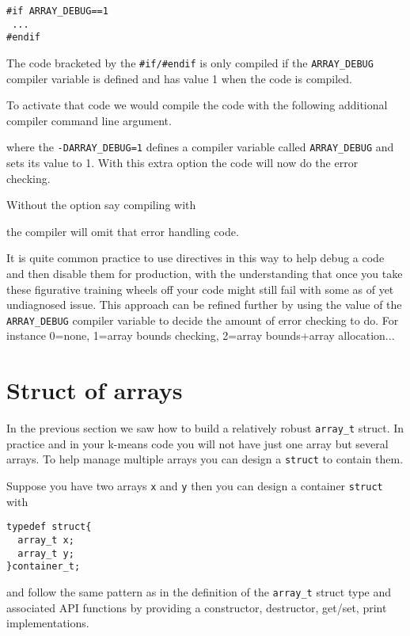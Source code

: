 \begin{verbatim}
#if ARRAY_DEBUG==1
 ...
#endif
\end{verbatim}
The code bracketed by the \texttt{\#if/\#endif} is only compiled if the \texttt{ARRAY\_DEBUG} compiler variable is defined and has value 1 when the code is compiled.

To activate that code we would compile the code with the following additional compiler command line argument.


where the \texttt{-DARRAY\_DEBUG=1} defines a compiler variable called \texttt{ARRAY\_DEBUG} and sets its value to 1. With this extra option the code will now do the error checking.

Without the option say compiling with 


the compiler will omit that error handling code. 

It is quite common practice to use directives in this way to help debug a code and then disable them for production, with the understanding that once you take these figurative training wheels off your code might still fail with some as of yet undiagnosed issue.  This approach can be refined further by using the value of the \texttt{ARRAY\_DEBUG} compiler variable to decide the amount of error checking to do. For instance 0=none, 1=array bounds checking, 2=array bounds+array allocation...

\section{Struct of arrays}

In the previous section we saw how to build a relatively robust \texttt{array\_t} struct. In practice and in your k-means code you will not have just one array but several arrays. To help manage multiple arrays you can design a \texttt{struct} to contain them. 

Suppose you have two arrays \texttt{x} and \texttt{y} then you can design a container \texttt{struct} with 

\begin{verbatim}
typedef struct{
  array_t x;
  array_t y;
}container_t;
\end{verbatim}

and follow the same pattern as in the definition of the \texttt{array\_t} struct type and associated API functions by providing a constructor, destructor, get/set, print implementations. 

